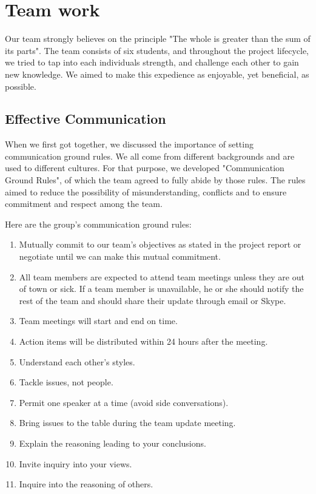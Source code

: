 \documentclass{article}
\begin{document}
\section{Team work}
Our team strongly believes on the principle "The whole is greater than the sum of its parts". The team consists of six students, and throughout the project lifecycle, we tried to tap into each individuals strength, and challenge each other to gain new knowledge. We aimed to make this expedience as enjoyable, yet beneficial, as possible.

\subsection{Effective Communication}
When we first got together, we discussed the importance of setting communication ground rules. We all come from different backgrounds and are used to different cultures. For that purpose, we developed "Communication Ground Rules", of which the team agreed to fully abide by those rules. The rules aimed to reduce the possibility of misunderstanding, conflicts and to ensure commitment and respect among the team.

Here are the group’s communication ground rules:
\begin{enumerate}
  \item Mutually commit to our team’s objectives as stated in the project report or negotiate until we can make this mutual commitment.
  \item All team members are expected to attend team meetings unless they are out of town or sick. If a team member is unavailable, he or she should notify the rest of the team and should share their update through email or Skype.
  \item Team meetings will start and end on time.
  \item Action items will be distributed within 24 hours after the meeting.
  \item Understand each other’s styles.
  \item Tackle issues, not people.
  \item Permit one speaker at a time (avoid side conversations).
  \item Bring issues to the table during the team update meeting.
  \item Explain the reasoning leading to your conclusions.
  \item Invite inquiry into your views.
  \item Inquire into the reasoning of others.
\end{enumerate}
\end{document}
